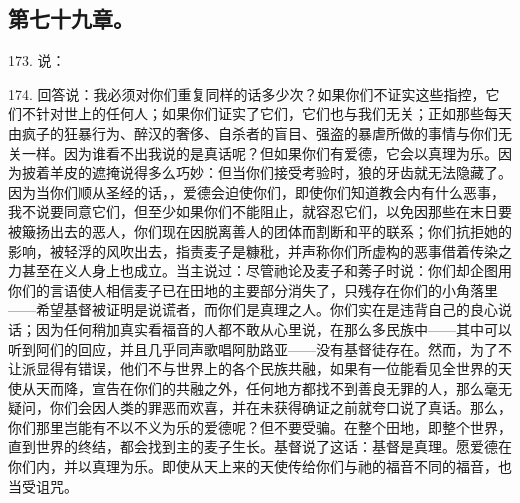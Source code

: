 
\subsection{第七十九章。}

173. 说：\par

174. 回答说：我必须对你们重复同样的话多少次？如果你们不证实这些指控，它们不针对世上的任何人；如果你们证实了它们，它们也与我们无关；正如那些每天由疯子的狂暴行为、醉汉的奢侈、自杀者的盲目、强盗的暴虐所做的事情与你们无关一样。因为谁看不出我说的是真话呢？但如果你们有爱德，它会以真理为乐。因为披着羊皮的遮掩说得多么巧妙：但当你们接受考验时，狼的牙齿就无法隐藏了。因为当你们顺从圣经的话，，爱德会迫使你们，即使你们知道教会内有什么恶事，我不说要同意它们，但至少如果你们不能阻止，就容忍它们，以免因那些在末日要被簸扬出去的恶人，你们现在因脱离善人的团体而割断和平的联系；你们抗拒她的影响，被轻浮的风吹出去，指责麦子是糠秕，并声称你们所虚构的恶事借着传染之力甚至在义人身上也成立。当主说过：尽管祂论及麦子和莠子时说：你们却企图用你们的言语使人相信麦子已在田地的主要部分消失了，只残存在你们的小角落里——希望基督被证明是说谎者，而你们是真理之人。你们实在是违背自己的良心说话；因为任何稍加真实看福音的人都不敢从心里说，在那么多民族中——其中可以听到阿们的回应，并且几乎同声歌唱阿肋路亚——没有基督徒存在。然而，为了不让派显得有错误，他们不与世界上的各个民族共融，如果有一位能看见全世界的天使从天而降，宣告在你们的共融之外，任何地方都找不到善良无罪的人，那么毫无疑问，你们会因人类的罪恶而欢喜，并在未获得确证之前就夸口说了真话。那么，你们那里岂能有不以不义为乐的爱德呢？但不要受骗。在整个田地，即整个世界，直到世界的终结，都会找到主的麦子生长。基督说了这话：基督是真理。愿爱德在你们内，并以真理为乐。即使从天上来的天使传给你们与祂的福音不同的福音，也当受诅咒。\par

